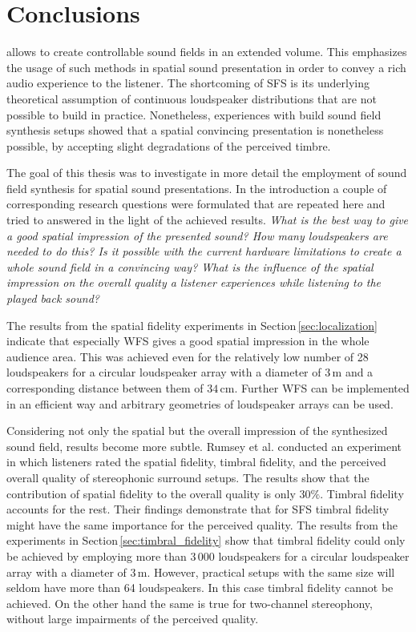 \chapter{Conclusions}
\label{cha:conclusions}

 allows to create controllable sound fields
in an extended volume. This emphasizes the usage of such methods in spatial
sound presentation in order to convey a rich audio experience to the
listener. The shortcoming of \ac{SFS} is its underlying theoretical assumption
of continuous loudspeaker distributions that are not possible to build in
practice. 
Nonetheless, experiences with build sound field synthesis setups showed that
a spatial convincing presentation is nonetheless possible, by accepting
slight degradations of the perceived timbre.

The goal of this thesis was to investigate in more detail the employment
of sound field synthesis for spatial sound presentations.
In the introduction a couple of
corresponding research questions were formulated that are repeated here
and tried to answered in the light of the achieved results.
\emph{What is the best way to give a good spatial
impression of the presented sound? How many loudspeakers are needed to do this?
Is it possible with the current hardware limitations to create a whole sound
field in a convincing way? What is the influence of the spatial impression on
the overall quality a listener experiences while listening to the played back
sound?}

The results from the spatial fidelity experiments in
Section\,\ref{sec:localization} indicate that especially
\ac{WFS} gives a good spatial impression in the whole audience area.
This was achieved even for the relatively low number of 28 loudspeakers for a
circular loudspeaker array with a diameter of $3$\,m and a corresponding
distance between them of $34$\,cm. Further \ac{WFS} can be
implemented in an efficient way and arbitrary geometries of
loudspeaker arrays can be used.

Considering not only the spatial but the overall impression of the synthesized
sound field, results become more subtle. Rumsey et al.\autocite{Rumsey2005}
conducted an experiment in which listeners rated the spatial fidelity, timbral
fidelity, and the perceived overall quality of stereophonic surround setups. The
results show that the contribution of spatial fidelity to the overall quality
is only $30\%$. Timbral fidelity accounts for the rest. Their findings
demonstrate that for \ac{SFS} timbral fidelity might have the same importance for
the perceived quality.
The results from the experiments in
Section\,\ref{sec:timbral_fidelity} show that timbral fidelity could only be
achieved by employing more than 3\,000 loudspeakers for a
circular loudspeaker array with a diameter of $3$\,m. However, practical setups
with the same size will seldom have more than 64 loudspeakers. In this case
timbral fidelity cannot be achieved. On the other hand the same is true for
two-channel stereophony, without large impairments of the perceived quality.

